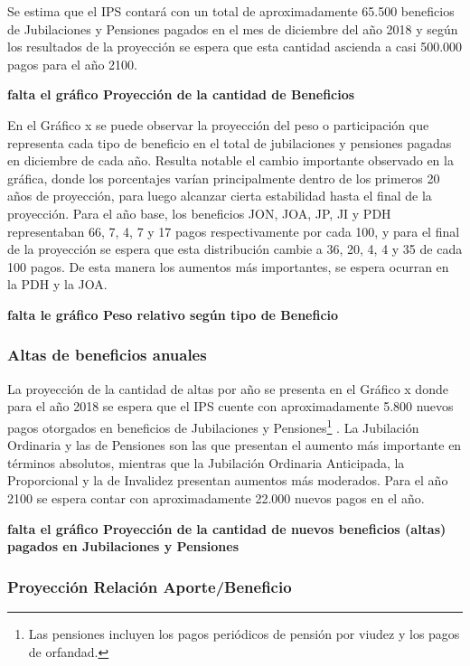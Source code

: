 \documentclass[a4paper,11pt]{article}
\begin{document}
Se estima que el IPS contará con un total de aproximadamente 65.500 beneficios de Jubilaciones y Pensiones pagados en el mes de diciembre del año 2018 y según los resultados de la proyección se espera que esta cantidad ascienda a casi 500.000 pagos para el año 2100. 

\textbf{falta el gráfico Proyección de la cantidad de Beneficios}

En el Gráfico x se puede observar la proyección del peso o participación que representa cada tipo de beneficio en el total de jubilaciones y pensiones pagadas en diciembre de cada año. Resulta notable el cambio importante observado en la gráfica, donde los porcentajes varían principalmente dentro de los primeros 20 años de proyección, para luego alcanzar cierta estabilidad hasta el final de la proyección. Para el año base, los beneficios JON, JOA, JP, JI y PDH representaban 66, 7, 4, 7 y 17 pagos respectivamente por cada 100, y para el final de la proyección se espera que esta distribución cambie a 36, 20, 4, 4 y 35 de cada 100 pagos. De esta manera los aumentos más importantes, se espera ocurran en la PDH y la JOA. 

\textbf{falta le gráfico Peso relativo según tipo de Beneficio}

\subsubsection{Altas de beneficios anuales}

La proyección de la cantidad de altas por año se presenta en el Gráfico x donde para el año 2018 se espera que el IPS cuente con aproximadamente 5.800 nuevos pagos otorgados en beneficios de Jubilaciones y Pensiones\footnote{Las pensiones incluyen los pagos periódicos de pensión por viudez y los pagos de orfandad.} . La Jubilación Ordinaria y las de Pensiones son las que presentan el aumento más importante en términos absolutos, mientras que la Jubilación Ordinaria Anticipada, la Proporcional y la de Invalidez presentan aumentos más moderados. Para el año 2100 se espera contar con aproximadamente 22.000 nuevos pagos en el año.

\textbf{falta el gráfico Proyección de la cantidad de nuevos beneficios (altas) pagados en Jubilaciones y Pensiones}

\subsubsection{Proyección Relación Aporte/Beneficio}
\end{document}
